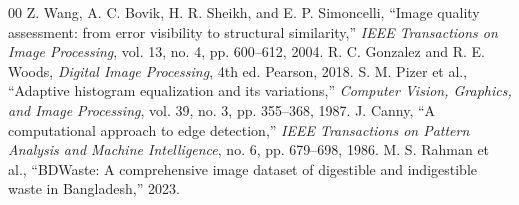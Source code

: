 \documentclass[conference]{IEEEtran}
\begin{document}
\begin{thebibliography}{00}
 Z. Wang, A. C. Bovik, H. R. Sheikh, and E. P. Simoncelli, ``Image quality assessment: from error visibility to structural similarity,'' \textit{IEEE Transactions on Image Processing}, vol. 13, no. 4, pp. 600--612, 2004.
 R. C. Gonzalez and R. E. Woods, \textit{Digital Image Processing}, 4th ed. Pearson, 2018.
 S. M. Pizer et al., ``Adaptive histogram equalization and its variations,'' \textit{Computer Vision, Graphics, and Image Processing}, vol. 39, no. 3, pp. 355--368, 1987.
 J. Canny, ``A computational approach to edge detection,'' \textit{IEEE Transactions on Pattern Analysis and Machine Intelligence}, no. 6, pp. 679--698, 1986.
 M. S. Rahman et al., ``BDWaste: A comprehensive image dataset of digestible and indigestible waste in Bangladesh,'' 2023.
\end{thebibliography}
\end{document}
